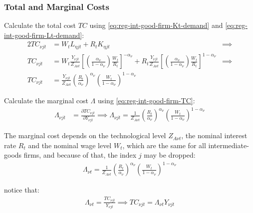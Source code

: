 \documentclass[
	thesis.tex
	]{subfiles}
\begin{document}
\subsubsection*{Total and Marginal Costs}

Calculate the total cost $TC$ using \ref{eq:reg-int-good-firm-Kt-demand} and \ref{eq:reg-int-good-firm-Lt-demand}:
\begin{alignat}{2}
	TC_{\nu jt} & = W_t L_{\eta jt} + R_t K_{\eta jt} &\implies \nonumber \\
	TC_{\nu jt} & = W_t \frac{Y_{\nu jt}}{Z_{A\nu t}} \left[ \left( \frac{{\alpha_\nu}}{1-{\alpha_\nu}} \right) \frac{W_t}{R_t} \right]^{-{\alpha_\nu}} + R_t \frac{Y_{\nu jt}}{Z_{A\nu t}} \left[ \left( \frac{{\alpha_\nu}}{1-{\alpha_\nu}} \right) \frac{W_t}{R_t} \right]^{1-{\alpha_\nu}} &\implies \nonumber \\
	TC_{\nu jt} & = \frac{Y_{\nu jt}}{Z_{A\nu t}} \left( \frac{R_t}{{\alpha_\nu}} \right)^{{\alpha_\nu}} \left( \frac{W_t}{1-{\alpha_\nu}} \right)^{1-{\alpha_\nu}} \label{eq:reg-int-good-firm-TC}
\end{alignat}


Calculate the marginal cost $\Lambda$ using \ref{eq:reg-int-good-firm-TC}: 
\begin{align}
	\Lambda_{\nu jt} & = \frac{\partial TC_{\nu jt}}{\partial Y_{\nu jt}} \implies 
	\Lambda_{\nu jt} = \frac{1}{Z_{A\nu t}} \left( \frac{R_t}{{\alpha_\nu}} \right)^{{\alpha_\nu}} \left( \frac{W_t}{1-{\alpha_\nu}} \right)^{1-{\alpha_\nu}} \label{eq:reg-int-good-firm-MC}
\end{align}

The marginal cost depends on the technological level $Z_{A\nu t}$, the nominal interest rate $R_t$ and the nominal wage level $W_t$, which are the same for all intermediate-goods firms, and because of that, the index $j$ may be dropped:
\begin{align}
	\label{eq:reg-int-good-firm-MC-2}
	\Lambda_{\nu t} = \frac{1}{Z_{A\nu t}} \left( \frac{R_t}{{\alpha_\nu}} \right)^{{\alpha_\nu}} \left( \frac{W_t}{1-{\alpha_\nu}} \right)^{1-{\alpha_\nu}}
\end{align}

notice that:
\begin{align}
	\label{eq:reg-int-good-firm-TC-MC}
	\Lambda_{\nu t} = \frac{TC_{\nu jt}}{Y_{\nu jt}} \implies 
	TC_{\nu jt} = \Lambda_{\nu t} Y_{\nu jt}
\end{align}

\end{document}
